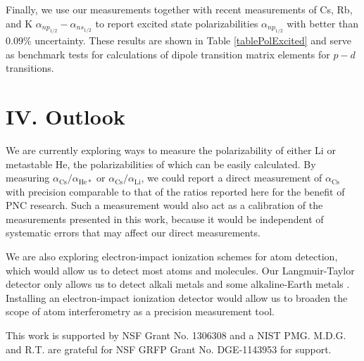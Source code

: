 \documentclass[twocolumn,prl,showpacs,superscriptaddress]{revtex4-1}   %
\newcommand{\acs}{\alpha_{\textrm{Cs}}}
\begin{document}
Finally, we use our measurements together with recent measurements of Cs, Rb, and K $\alpha_{np_{1/2}} - \alpha_{ns_{1/2}}$ \cite{Hunter1991,Miller1994} to report excited state polarizabilities $\alpha_{np_{1/2}}$ with better than 0.09\% uncertainty. 
These results are shown in Table \ref{tablePolExcited} and serve as benchmark tests for calculations of dipole transition matrix elements for $p-d$ transitions.

\section{IV. Outlook}

We are currently exploring ways to measure the polarizability of either Li or metastable He, the polarizabilities of which can be easily calculated. By measuring $\acs/\alpha_{\mathrm{He*}}$ or $\acs/\alpha_{\mathrm{Li}}$, we could report a direct measurement of $\acs$ with precision comparable to that of the ratios reported here for the benefit of PNC research. Such a measurement would also act as a calibration of the measurements presented in this work, because it would be independent of systematic errors that may affect our direct measurements.

We are also exploring electron-impact ionization schemes for atom detection, which would allow us to detect most atoms and molecules. Our Langmuir-Taylor detector only allows us to detect alkali metals and some alkaline-Earth metals \cite{Delhuille2002}. Installing an electron-impact ionization detector would allow us to broaden the scope of atom interferometry as a precision measurement tool. 

This work is supported by NSF Grant No. 1306308 and a NIST PMG. M.D.G. and R.T. are grateful for NSF GRFP Grant No. DGE-1143953 for support. 


%

\end{document}
